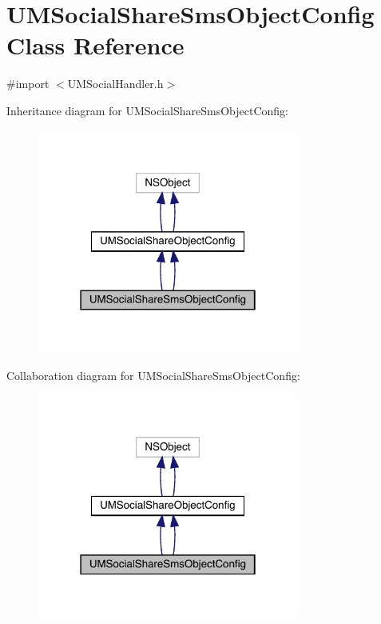 \hypertarget{interface_u_m_social_share_sms_object_config}{}\section{U\+M\+Social\+Share\+Sms\+Object\+Config Class Reference}
\label{interface_u_m_social_share_sms_object_config}


{\ttfamily \#import $<$U\+M\+Social\+Handler.\+h$>$}



Inheritance diagram for U\+M\+Social\+Share\+Sms\+Object\+Config\+:\nopagebreak
\begin{figure}[H]
\begin{center}
\leavevmode
\includegraphics[width=243pt]{interface_u_m_social_share_sms_object_config__inherit__graph}
\end{center}
\end{figure}


Collaboration diagram for U\+M\+Social\+Share\+Sms\+Object\+Config\+:\nopagebreak
\begin{figure}[H]
\begin{center}
\leavevmode
\includegraphics[width=243pt]{interface_u_m_social_share_sms_object_config__coll__graph}
\end{center}
\end{figure}

